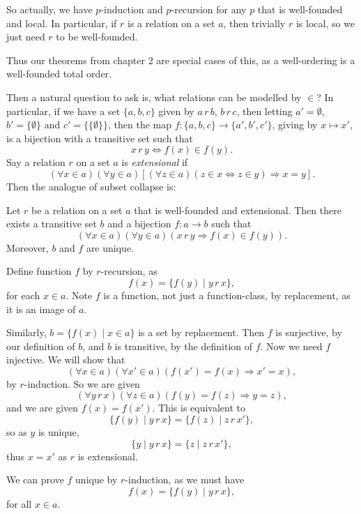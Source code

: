 \documentclass[12pt]{article}
\begin{document}
So actually, we have $p$-induction and $p$-recursion for any $p$ that is well-founded and local. In particular, if $r$ is a relation on a set $a$, then trivially $r$ is local, so we just need $r$ to be well-founded.

Thus our theorems from chapter 2 are special cases of this, as a well-ordering is a well-founded total order.

Then a natural question to ask is, what relations can be modelled by $\in$? In particular, if we have a set $\{a, b, c\}$ given by $a \, r \, b$, $b \,r \, c$, then letting $a' = \emptyset$, $b' = \{\emptyset\}$ and $c' = \{\{\emptyset\}\}$, then the map $f:\{a, b, c\} \to \{a', b', c'\}$, giving by $x \mapsto x'$, is a bijection with a transitive set such that
\[
x \, r \, y \iff f(x) \in f(y).
\]
Say a relation $r$ on a set $a$ is \emph{extensional} if
\[
	(\forall x \in a)(\forall y \in a)[(\forall z \in a)(z \in x \iff z \in y) \Rightarrow x = y].
\]
Then the analogue of subset collapse is:
\begin{theorem}
	Let $r$ be a relation on a set $a$ that is well-founded and extensional. Then there exists a transitive set $b$ and a bijection $f : a \to b$ such that
	\[
		(\forall x \in a)(\forall y \in a)(x \, r \, y \Rightarrow f(x) \in f(y)).
	\]
	Moreover, $b$ and $f$ are unique.
\end{theorem}

\begin{proofbox}
	Define function $f$ by $r$-recursion, as
	\[
		f(x) = \{f(y) \mid y \, r \, x\},
	\]
	for each $x \in a$. Note $f$ is a function, not just a function-class, by replacement, as it is an image of $a$.

	Similarly, $b = \{f(x) \mid x \in a\}$ is a set by replacement. Then $f$ is surjective, by our definition of $b$, and $b$ is transitive, by the definition of $f$. Now we need $f$ injective. We will show that
	\[
		(\forall x \in a)(\forall x' \in a)(f(x') = f(x) \Rightarrow x' = x),
	\]
	by $r$-induction. So  we are given
	\[
		(\forall y \, r \, x)(\forall z \in a)(f(y) = f(z) \Rightarrow y = z),
	\]
	and we are given $f(x) = f(x')$. This is equivalent to
	\[
		\{f(y) \mid y \, r \, x\} = \{f(z) \mid z \, r \, x'\},
	\]
	so as $y$ is unique,
	\[
		\{y \mid y \, r \, x\} = \{z \mid z \, r \, x'\},
	\]
	thus $x = x'$ as $r$ is extensional.

	We can prove $f$ unique by $r$-induction, as we must have
	\[
		f(x) = \{f(y) \mid y \, r \, x\},
	\]
	for all $x \in a$.
\end{proofbox}
\end{document}
